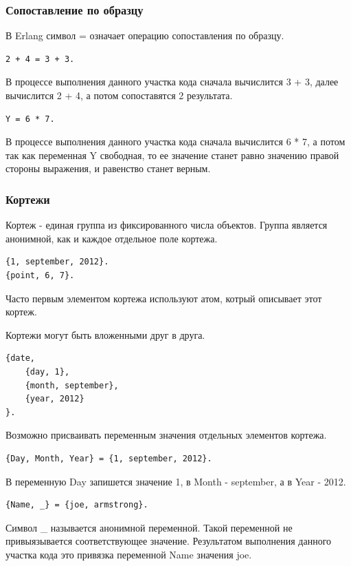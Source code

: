 		\subsubsection{Сопоставление по образцу}
			В Erlang символ = означает операцию сопоставления по
			образцу.
			\begin{lstlisting}
2 + 4 = 3 + 3.
			\end{lstlisting}
			В процессе выполнения данного участка кода сначала вычислится 
			3 + 3, далее вычислится 2 + 4, а потом сопоставятся 2 результата.
			\begin{lstlisting}
Y = 6 * 7.
			\end{lstlisting}
			В процессе выполнения данного участка кода сначала вычислится
			6 * 7, а потом так как переменная Y свободная, то ее значение станет 
			равно значению правой стороны выражения, и равенство станет верным.
			

		\subsubsection{Кортежи}
			Кортеж - единая группа из фиксированного числа объектов. Группа является 
			анонимной, как и каждое отдельное поле кортежа.
			\begin{lstlisting}
{1, september, 2012}.
{point, 6, 7}.
			\end{lstlisting}
			Часто первым элементом кортежа используют атом, котрый описывает этот кортеж.
		
			Кортежи могут быть вложенными друг в друга.
			\begin{lstlisting}
{date,
	{day, 1},
	{month, september},
	{year, 2012}
}.
			\end{lstlisting}

			Возможно присваивать переменным значения отдельных элементов кортежа.
			\begin{lstlisting}
{Day, Month, Year} = {1, september, 2012}.
			\end{lstlisting}
			В переменную Day запишется значение 1, в Month - september, а в Year - 2012.
			
			\begin{lstlisting}
{Name, _} = {joe, armstrong}.
			\end{lstlisting}
			Символ \_ называется анонимной переменной. Такой переменной не привыязывается 
			соответствующее значение. Результатом выполнения данного участка кода это привязка
			переменной Name значения joe.


